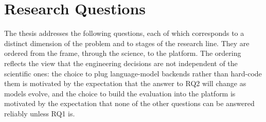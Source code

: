 \section{Research Questions}
\label{sec:research-questions}

The thesis addresses the following questions, each of which corresponds to a distinct
dimension of the problem and to stages of the research line. They are ordered from the
frame, through the science, to the platform. The ordering reflects the view that the
engineering decisions are not independent of the scientific ones: the choice to plug
language-model backends rather than hard-code them is motivated by the expectation that
the answer to RQ2 will change as models evolve, and the choice to build the evaluation
into the platform is motivated by the expectation that none of the other questions can
be answered reliably unless RQ1 is.

